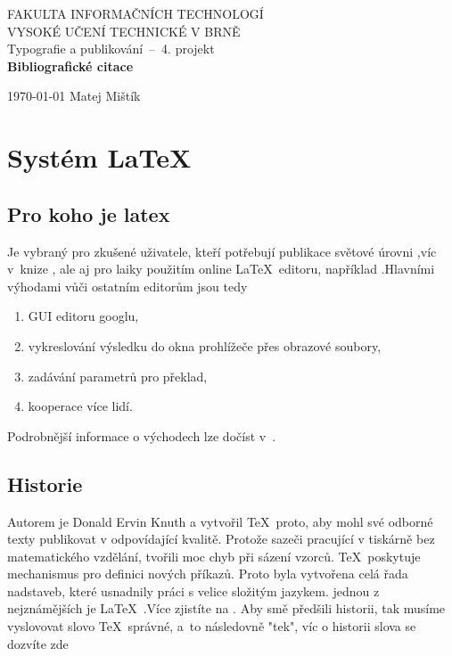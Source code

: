 \documentclass[a4paper, 11pt]{article}
\begin{document}
\begin{titlepage}
\begin{center}

\huge
{FAKULTA INFORMAČNÍCH TECHNOLOGÍ\\[0.4em]
VYSOKÉ UČENÍ TECHNICKÉ V BRNĚ}\\
\LARGE
{Typografie a publikování \,--\, 4. projekt \\[0.3em] 
\textbf{\huge{Bibliografické citace}}}

{\LARGE \today \hfill 
{Matej Mištík }}

\end{center}
\end{titlepage}

	\section{Systém \LaTeX}
	
	\subsection{Pro koho je latex}
	Je vybraný pro zkušené  uživatele, kteří potřebují publikace světové úrovni ,víc v~knize \cite{Knuth1990}, ale aj pro laiky použitím online \LaTeX\ editoru, například \cite{Simecek2013}.Hlavními výhodami vůči ostatním editorům jsou tedy 
		\begin{enumerate}
		\item GUI editoru googlu,
		\item vykreslování výsledku do okna prohlížeče přes obrazové soubory,
		\item zadávání parametrů pro překlad,
		\item kooperace více lidí.
	\end{enumerate}
	Podrobnější informace o východech lze dočíst v~\cite{Sokol2012}.

	
	\subsection{Historie}
	Autorem je Donald Ervin Knuth a vytvořil \TeX\ proto, aby mohl své odborné texty publikovat v odpovídající kvalitě. Protože sazeči pracující v tiskárně bez matematického vzdělání, tvořili moc chyb při sázení vzorců.
    \TeX\ poskytuje mechanismus pro definici nových příkazů. Proto byla vytvořena
    celá řada nadstaveb, které usnadnily práci s velice složitým jazykem. jednou z nejznámějších je \LaTeX\ .Více zjistíte na \cite{Pysny2009}.
    Aby smě předšili historii, tak musíme vyslovovat slovo \TeX\ správné, a~to následovně "tek", víc o historii slova se dozvíte zde \cite{Slantchev}
    
\end{document}
